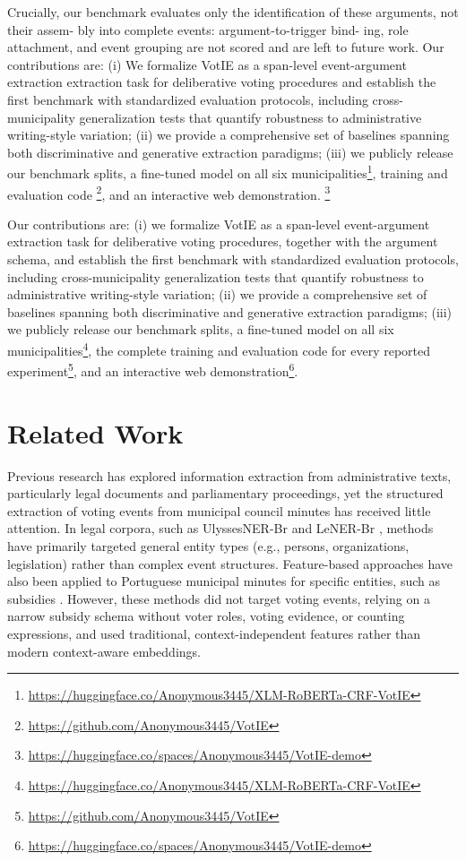 \documentclass[11pt]{article}
\begin{document}
Crucially, our benchmark evaluates only the
identification of these arguments, not their assem-
bly into complete events: argument-to-trigger bind-
ing, role attachment, and event grouping are not
scored and are left to future work. Our contributions are: (i) We formalize VotIE as a span-level event-argument extraction extraction task for deliberative voting procedures and establish the first benchmark with standardized evaluation protocols, including cross-municipality generalization tests that quantify robustness to administrative writing-style variation; (ii) we provide a comprehensive set of baselines spanning both discriminative and generative extraction paradigms; (iii) we publicly release our benchmark splits, a fine-tuned model on all six municipalities\footnote{\url{https://huggingface.co/Anonymous3445/XLM-RoBERTa-CRF-VotIE}}, training and evaluation code \footnote{\url{https://github.com/Anonymous3445/VotIE}}, and an interactive web demonstration. \footnote{\url{https://huggingface.co/spaces/Anonymous3445/VotIE-demo}}


Our contributions are: (i) we formalize VotIE as a span-level event-argument extraction task for deliberative voting procedures, together with the argument schema, and establish the first benchmark with standardized evaluation protocols, including cross-municipality generalization tests that quantify robustness to administrative writing-style variation; (ii) we provide a comprehensive set of baselines spanning both discriminative and generative extraction paradigms; (iii) we publicly release our benchmark splits, a fine-tuned model on all six municipalities\footnote{\url{https://huggingface.co/Anonymous3445/XLM-RoBERTa-CRF-VotIE}}, the complete training and evaluation code for every reported experiment\footnote{\url{https://github.com/Anonymous3445/VotIE}}, and an interactive web demonstration\footnote{\url{https://huggingface.co/spaces/Anonymous3445/VotIE-demo}}.


\section{Related Work}

Previous research has explored information extraction from administrative texts, particularly legal documents and parliamentary proceedings, yet the structured extraction of voting events from municipal council minutes has received little attention. In legal corpora, such as UlyssesNER-Br \cite{ulyssesner} and LeNER-Br \cite{LeNER-BR}, methods have primarily targeted general entity types (e.g., persons, organizations, legislation) rather than complex event structures. Feature-based approaches have also been applied to Portuguese municipal minutes for specific entities, such as subsidies \cite{portuguese-municipal-minutes-2010}. However, these methods did not target voting events, relying on a narrow subsidy schema without voter roles, voting evidence, or counting expressions, and used traditional, context-independent features rather than modern context-aware embeddings.
\end{document}
